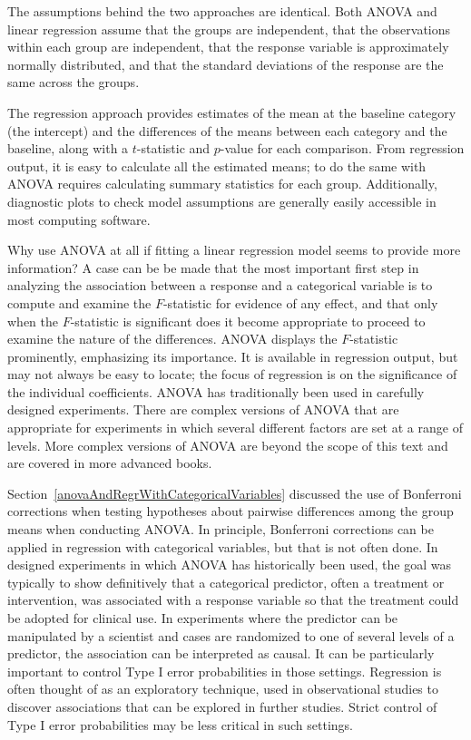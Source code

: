 The assumptions behind the two approaches are identical.  Both ANOVA and linear regression assume that the groups are independent, that the observations within each group are independent, that the response variable is approximately normally distributed, and that the standard deviations of the response are the same across the groups.  

The regression approach provides estimates of the mean at the baseline category (the intercept) and the differences of the means between each category and the baseline, along with a $t$-statistic and $p$-value for each comparison. From regression output, it is easy to calculate all the estimated means; to do the same with ANOVA requires calculating summary statistics for each group. Additionally, diagnostic plots to check model assumptions are generally easily accessible in most computing software.  

\textD{\newpage}

Why use ANOVA at all if fitting a linear regression model seems to provide more information?  A case can be be made that the most important first step in analyzing the association between a response and a categorical variable is to compute and examine the $F$-statistic for evidence of any effect, and that only when the $F$-statistic is significant does it become appropriate to proceed to examine the nature of the differences. ANOVA displays the $F$-statistic prominently, emphasizing its importance. It is available in regression output, but may not always be easy to locate; the focus of regression is on the significance of the individual coefficients.  ANOVA has traditionally been used in carefully designed experiments. There are complex versions of ANOVA that are appropriate for experiments in which several different factors are set at a range of levels.  More complex versions of ANOVA are beyond the scope of this text and are covered in more advanced books. 

Section~\ref{anovaAndRegrWithCategoricalVariables} discussed the use of Bonferroni corrections when testing hypotheses about pairwise differences among the group means when conducting ANOVA. In principle, Bonferroni corrections can be applied in regression with categorical variables, but that is not often done. In designed experiments in which ANOVA has historically been used, the goal was typically to show definitively that a categorical predictor, often a treatment or intervention, was associated with a response variable so that the treatment could be adopted for clinical use. In experiments where the predictor can be manipulated by a scientist and cases are randomized to one of several levels of a predictor, the association can be interpreted as causal.  It can be particularly important to control Type I error probabilities in those settings.  Regression is often thought of as an exploratory technique, used in observational studies to discover associations that can be explored in further studies.  Strict control of Type I error probabilities may be less critical in such settings.

